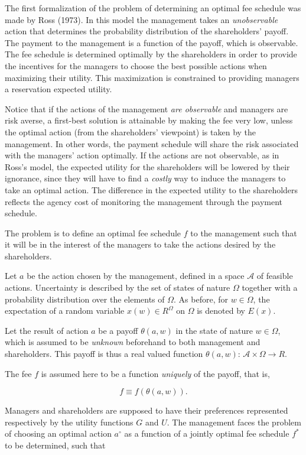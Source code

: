 \documentclass[11pt,a4paper]{article}
\begin{document}
The first formalization of the problem of determining an optimal fee schedule was made by Ross
(1973). In this model the management takes an \emph{unobservable} action that determines the
probability distribution of the shareholders' payoff. The payment to the management is a function of
the payoff, which is observable. The fee schedule is determined optimally by the shareholders in
order to provide the incentives for the managers to choose the best possible actions when maximizing
their utility. This maximization is constrained to providing managers a reservation expected
utility.

Notice that if the actions of the management \emph{are observable} and managers are risk averse, a
first-best solution is attainable by making the fee very low, unless the optimal action (from the
shareholders' viewpoint) is taken by the management. In other words, the payment schedule will share
the risk associated with the managers' action optimally. If the actions are not observable, as in
Ross's model, the expected utility for the shareholders will be lowered by their ignorance, since
they will have to find a \emph{costly} way to induce the managers to take an optimal action. The
difference in the expected utility to the shareholders reflects the agency cost of monitoring the
management through the payment schedule.

The problem is to define an optimal fee schedule \(f\) to the management such that it will be in the
interest of the managers to take the actions desired by the shareholders.

Let \(a\) be the action chosen by the management, defined in a space \(\mathcal{A}\) of feasible
actions. Uncertainty is described by the set of states of nature \(\Omega\) together with a
probability distribution over the elements of \(\Omega\). As before, for \(w \in \Omega\), the
expectation of a random variable \(x(w) \in R^\Omega\) on \(\Omega\) is denoted by \(E(x)\).

Let the result of action \(a\) be a payoff \(\theta(a, w)\) in the state of nature \(w \in \Omega\),
which is assumed to be \emph{unknown} beforehand to both management and shareholders. This payoff is
thus a real valued function \(\theta(a, w)\): \(\mathcal{A} \times \Omega \to R\).

The fee \(f\) is assumed here to be a function \emph{uniquely} of the payoff, that is,

\[f \equiv f(\theta(a, w)).\]

Managers and shareholders are supposed to have their preferences represented respectively by the
utility functions \(G\) and \(U\). The management faces the problem of choosing an optimal action
\(a^\circ\) as a function of a jointly optimal fee schedule \(f^*\) to be determined, such that
\end{document}

